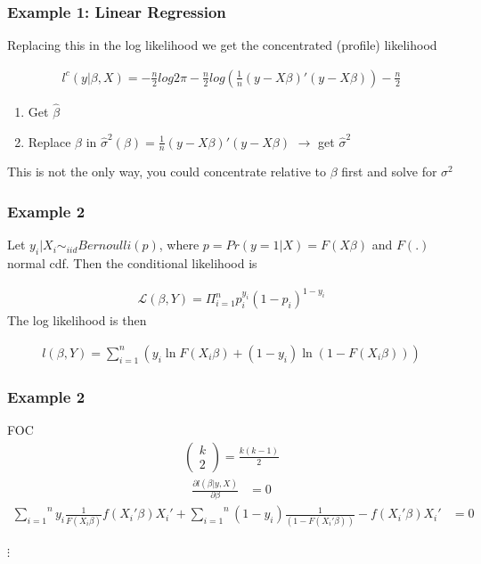 \documentclass[
  shownotes,
  xcolor={svgnames},
  hyperref={colorlinks,citecolor=DarkBlue,linkcolor=DarkRed,urlcolor=DarkBlue}
  , aspectratio=169]{beamer}
\begin{document}
\begin{frame}[fragile]
\frametitle{Example 1: Linear Regression}

Replacing this in the log likelihood we get the concentrated (profile) likelihood

\begin{align}
l^c(y|\beta,X) = -\frac{n}{2}log 2 \pi-\frac{n}{2}log\left( \frac{1}{n}(y-X\beta)'(y-X\beta)\right)-\frac{n}{2}
\end{align}

\medskip

\begin{enumerate}
 \item Get $\hat \beta$
 \item Replace $\beta$ in $\hat \sigma^2(\beta) = \frac{1}{n}(y-X\beta)'(y-X\beta)$ $\rightarrow$ get $\hat \sigma^2$
\end{enumerate}

\medskip

This is not the only way, you could concentrate relative to $\beta$ first and solve for $\sigma^2$

\end{frame}
\begin{frame}[fragile]
\frametitle{Example 2}

Let $y_i|X_i \sim_{iid} Bernoulli(p)$, where $p=Pr(y=1|X)=F(X\beta)$ and $F(.)$ normal cdf. Then the conditional likelihood is

\begin{align}
\mathcal{L}(\beta,Y)=\Pi_{i=1}^n p_i^{y_i}(1-p_i)^{1-y_i}
\end{align}
The log likelihood is then

\begin{align}
l(\beta,Y)=\sum_{i=1}^n\left(y_i \ln F(X_i\beta)+(1-y_i)\ln(1-F(X_i\beta))\right)
\end{align}

\end{frame}
\begin{frame}[fragile]
\frametitle{Example 2}
FOC
\begin{align}
\left(\begin{array}{c}
k\\
2
\end{array}\right)=\frac{k(k-1)}{2}
\end{align}
\begin{align}
\frac{\partial l(\beta|y,X)}{\partial\beta}&=0 
\end{align}
\begin{align}
\overset{n}{\underset{i=1}{\sum}}y_{i}\frac{1}{F(X_{i}\beta)}f(X_{i}'\beta)X_{i}'+\overset{n}{\underset{i=1}{\sum}}\left(1-y_{i}\right)\frac{1}{\left(1-F(X_{i}'\beta)\right)}-f(X_{i}'\beta)X_{i}'&=0
\end{align}

\begin{centering}
$\vdots$
\end{centering}

\end{frame}
\end{document}
